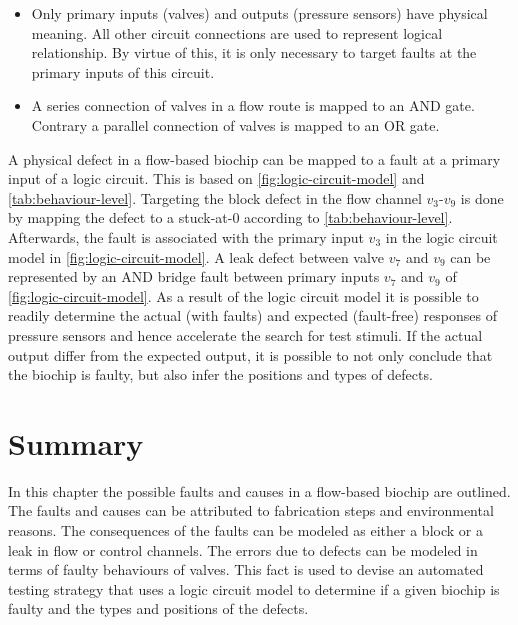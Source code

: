\begin{itemize}
\item Only primary inputs (valves) and outputs (pressure sensors) have physical meaning. All other circuit connections are used to represent logical relationship. By virtue of this, it is only necessary to target faults at the primary inputs of this circuit.
\item A series connection of valves in a flow route is mapped to an AND gate. Contrary a parallel connection of valves is mapped to an OR gate.
\end{itemize}

A physical defect in a flow-based biochip can be mapped to a fault at a primary input of a logic circuit. This is based on \autoref{fig:logic-circuit-model} and \autoref{tab:behaviour-level}. Targeting the block defect in the flow channel $v_3$-$v_9$ is done by mapping the defect to a stuck-at-0 according to \autoref{tab:behaviour-level}. Afterwards, the fault is associated with the primary input $v_3$ in the logic circuit model in \autoref{fig:logic-circuit-model}. A leak defect between valve $v_7$ and $v_9$ can be represented by an AND bridge fault between primary inputs $v_7$ and $v_9$ of \autoref{fig:logic-circuit-model}. As a result of the logic circuit model it is possible to readily determine the actual (with faults) and expected (fault-free) responses of pressure sensors and hence accelerate the search for test stimuli. If the actual output differ from the expected output, it is possible to not only conclude that the biochip is faulty, but also infer the positions and types of defects.

\section{Summary}
In this chapter the possible faults and causes in a flow-based biochip are outlined. The faults and causes can be attributed to fabrication steps and environmental reasons. The consequences of the faults can be modeled as either a block or a leak in flow or control channels. The errors due to defects can be modeled in terms of faulty behaviours of valves. This fact is used to devise an automated testing strategy that uses a logic circuit model to determine if a given biochip is faulty and the types and positions of the defects.